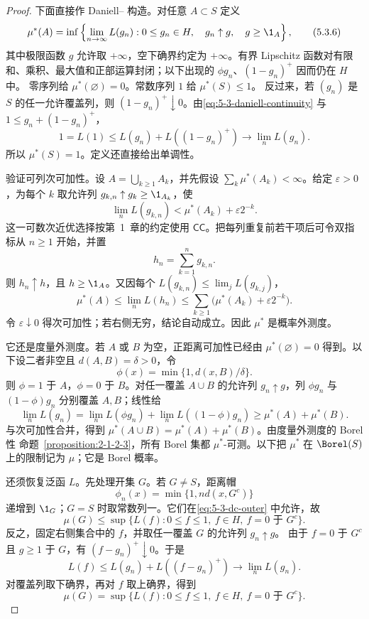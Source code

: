 \begin{proof}
下面直接作 Daniell--\Caratheodory{} 构造。对任意 $A\subset S$ 定义
\[
 \mu^*(A)=\inf\left\{
 \lim_{n\to\infty}L(g_n):
 0\le g_n\in H,\quad g_n\uparrow g,\quad g\ge\1_A
 \right\},
 \tag{5.3.6}\label{eq:5-3-dc-outer}
\]
其中极限函数 $g$ 允许取 $+\infty$，空下确界约定为 $+\infty$。有界
Lipschitz 函数对有限和、乘积、最大值和正部运算封闭；以下出现的
$\phi g_n$、$(1-g_n)^+$ 因而仍在 $H$ 中。
零序列给 $\mu^*(\varnothing)=0$。常数序列 $1$ 给 $\mu^*(S)\le1$。
反过来，若 $(g_n)$ 是 $S$ 的任一允许覆盖列，则
$(1-g_n)^+\downarrow0$。由\eqref{eq:5-3-daniell-continuity} 与
$1\le g_n+(1-g_n)^+$，
\[
 1=L(1)\le L(g_n)+L((1-g_n)^+)\longrightarrow\lim_nL(g_n).
\]
所以 $\mu^*(S)=1$。定义还直接给出单调性。

验证可列次可加性。设 $A=\bigcup_{k\ge1}A_k$，并先假设
$\sum_k\mu^*(A_k)<\infty$。给定 $\varepsilon>0$，为每个 $k$ 取允许列
$g_{k,n}\uparrow g_k\ge\1_{A_k}$，使
\[
 \lim_nL(g_{k,n})<\mu^*(A_k)+\varepsilon2^{-k}.
\]
这一可数次近优选择按第~1~章的约定使用 $\textsf{CC}$。把每列重复前若干项后可令双指标从
$n\ge1$ 开始，并置
\[
 h_n=\sum_{k=1}^n g_{k,n}.
\]
则 $h_n\uparrow h$，且 $h\ge\1_A$。又因每个
$L(g_{k,n})\le\lim_jL(g_{k,j})$，
\[
 \mu^*(A)\le\lim_nL(h_n)
 \le\sum_{k\ge1}\bigl(\mu^*(A_k)+\varepsilon2^{-k}\bigr).
\]
令 $\varepsilon\downarrow0$ 得次可加性；若右侧无穷，结论自动成立。因此 $\mu^*$ 是概率外测度。

它还是度量外测度。若 $A$ 或 $B$ 为空，正距离可加性已经由
$\mu^*(\varnothing)=0$ 得到。以下设二者非空且 $d(A,B)=\delta>0$，令
\[
 \phi(x)=\min\{1,d(x,B)/\delta\}.
\]
则 $\phi=1$ 于 $A$，$\phi=0$ 于 $B$。对任一覆盖 $A\cup B$ 的允许列
$g_n\uparrow g$，列 $\phi g_n$ 与 $(1-\phi)g_n$ 分别覆盖 $A,B$；线性给
\[
 \lim_nL(g_n)
 =\lim_nL(\phi g_n)+\lim_nL((1-\phi)g_n)
 \ge\mu^*(A)+\mu^*(B).
\]
与次可加性合并，得到
$\mu^*(A\cup B)=\mu^*(A)+\mu^*(B)$。由度量外测度的 Borel 性
命题~\ref{proposition:2-1-2-3}，所有 Borel 集都 $\mu^*$-可测。以下把 $\mu^*$ 在
$\Borel(S)$ 上的限制记为 $\mu$；它是 Borel 概率。

还须恢复泛函 $L$。先处理开集 $G$。若 $G\ne S$，距离帽
\[
 \phi_n(x)=\min\{1,nd(x,G^c)\}
\]
递增到 $\1_G$；$G=S$ 时取常数列一。它们在\eqref{eq:5-3-dc-outer} 中允许，故
\[
 \mu(G)\le
 \sup\{L(f):0\le f\le1,\ f\in H,\ f=0\text{ 于 }G^c\}.
 \tag{5.3.7}\label{eq:5-3-dc-open-lower}
\]
反之，固定右侧集合中的 $f$，并取任一覆盖 $G$ 的允许列 $g_n\uparrow g$。
由于 $f=0$ 于 $G^c$ 且 $g\ge1$ 于 $G$，有 $(f-g_n)^+\downarrow0$。于是
\[
 L(f)\le L(g_n)+L((f-g_n)^+)\longrightarrow\lim_nL(g_n).
\]
对覆盖列取下确界，再对 $f$ 取上确界，得到
\[
 \mu(G)=
 \sup\{L(f):0\le f\le1,\ f\in H,\ f=0\text{ 于 }G^c\}.
 \tag{5.3.8}\label{eq:5-3-dc-open-formula}
\]


\end{proof}
